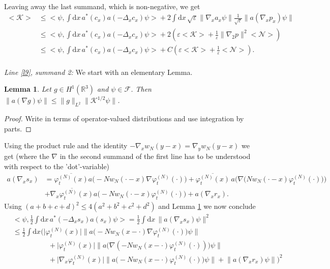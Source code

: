 \documentclass[11pt,a4paper,draft,DIV11]{scrartcl}	%
\newtheorem{lem}[thm]{Lemma}
\newcommand{\fock}{\mathcal{F}}		%
\newcommand{\di}{\textrm{d}}		%
\newcommand{\Ncal}{\mathcal{N}}		%
\newcommand{\Kcal}{\mathcal{K}}		%
\newcommand{\estlist}[2]{\emph{\vspace{.3em}\\Line \ref{l#1}, summand #2:}}
\newcommand{\scal}[2]{\big<#1,#2\big>} %
\newcommand{\cc}[1]{\overline{#1}}	%
\newcommand{\Rbb}{\mathbb{R}}		%
\newcommand{\norm}[1]{\lVert#1\rVert}	%
\newcommand{\ev}[1]{\big<#1\big>}	%
\newcommand{\ph}{\varphi_t^{(N)}}	%
\newcommand{\gradone}{\nabla_2}
\begin{document}
\begin{fleqn}[0.5em]
\begin{align*}
\end{align*}
Leaving away the last summand, which is non-negative, we get
\begin{equation}
\label{eq:bound1A}
\begin{split}
 \ev{\Kcal} & \leq \scal{\psi}{\int \di x\, a^\ast(c_x) a(-\Delta_x c_x)\psi} + 2\int \di x\, \sqrt{\varepsilon} \norm{\nabla_x a_x \psi} \frac{1}{\sqrt{\varepsilon}} \norm{a(\nabla_x p_x)\psi} \\
& \leq \scal{\psi}{\int \di x\, a^\ast(c_x) a(-\Delta_x c_x)\psi} + 2\left( \varepsilon \ev{\Kcal} + \frac{1}{\varepsilon}  \norm{\gradone p}^2 \ev{\Ncal}\right) \\
& \leq \scal{\psi}{\int \di x\,a^\ast(c_x) a(-\Delta_x c_x)\psi} + C\left( \varepsilon \ev{\Kcal} + \frac{1}{\varepsilon}\ev{\Ncal} \right).
\end{split}
\end{equation}
\estlist{9}{2}
We start with an elementary Lemma.
\begin{lem} \label{l:agradnorm}
 Let $g \in H^1(\Rbb^3)$ and $\psi \in \fock$. Then $\norm{a(\nabla g)\psi}  \leq \norm{g}_{L^2} \norm{\Kcal^{1/2}\psi}$.
\end{lem}
\begin{proof}
Write in terms of operator-valued distributions and use integration by parts. 
\end{proof}
Using the product rule and the identity $-\nabla_x w_N(y-x) = \nabla_y w_N(y-x)$ we get (where the $\nabla$ in the second summand of the first line has to be understood with respect to the 'dot'-variable)
\begin{align*}
 a(\nabla_x s_x) & = \cc{\ph(x)} a\big(-Nw_N(\cdot-x)\nabla\ph(\cdot)\big) + \cc{\ph(x)}\,a\Big(\nabla\big(N w_N(\cdot-x)\ph(\cdot)\big)\Big) \\
 & + \cc{\nabla_x \ph(x)} a\big(-Nw_N(\cdot-x)\ph(\cdot)\big) + a(\nabla_x r_x).
\end{align*}
Using $(a+b+c+d)^2 \leq 4(a^2+b^2+c^2+d^2)$ and Lemma \ref{l:agradnorm} we now conclude
\begin{align*}
 & \scal{\psi}{\frac{1}{2}\int \di x\, a^\ast(-\Delta_x s_x) a(s_x)\psi} = \frac{1}{2}\int \di x\, \norm{a(\nabla_x s_x)\psi}^2 \\
& \leq \frac{1}{2} \int \di x \Big( \lvert \ph(x)\rvert \norm{a\big(-Nw_N(x-\cdot)\nabla\ph(\cdot)\big)\psi} \\
& \qquad\qquad\quad + \lvert \ph(x)\rvert \norm{a\big(\nabla(-N w_N(x-\cdot)\ph(\cdot))\big)\psi} \\
& \qquad\qquad\quad + \lvert \nabla_x \ph(x)\rvert \norm{a\big(-Nw_N(x-\cdot)\ph(\cdot)\big)\psi} + \norm{a(\nabla_x r_x)\psi}  \Big)^2 \\

\end{align*}
\end{fleqn}
\end{document}
